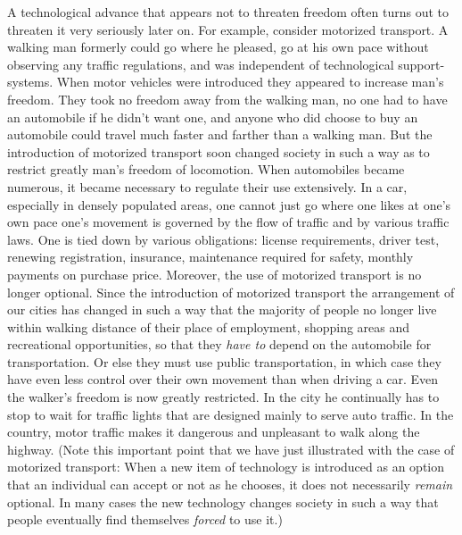  A technological advance that appears not to threaten freedom often turns out to threaten it very seriously later on. For example, consider motorized transport. A walking man formerly could go where he pleased, go at his own pace without observing any traffic regulations, and was independent of technological support-systems. When motor vehicles were introduced they appeared to increase man’s freedom. They took no freedom away from the walking man, no one had to have an automobile if he didn’t want one, and anyone who did choose to buy an automobile could travel much faster and farther than a walking man. But the introduction of motorized transport soon changed society in such a way as to restrict greatly man’s freedom of locomotion. When automobiles became numerous, it became necessary to regulate their use extensively. In a car, especially in densely populated areas, one cannot just go where one likes at one’s own pace one’s movement is governed by the flow of traffic and by various traffic laws. One is tied down by various obligations: license requirements, driver test, renewing registration, insurance, maintenance required for safety, monthly payments on purchase price. Moreover, the use of motorized transport is no longer optional. Since the introduction of motorized transport the arrangement of our cities has changed in such a way that the majority of people no longer live within walking distance of their place of employment, shopping areas and recreational opportunities, so that they {\em have to} depend on the automobile for transportation. Or else they must use public transportation, in which case they have even less control over their own movement than when driving a car. Even the walker’s freedom is now greatly restricted. In the city he continually has to stop to wait for traffic lights that are designed mainly to serve auto traffic. In the country, motor traffic makes it dangerous and unpleasant to walk along the highway. (Note this important point that we have just illustrated with the case of motorized transport: When a new item of technology is introduced as an option that an individual can accept or not as he chooses, it does not necessarily {\em remain} optional. In many cases the new technology changes society in such a way that people eventually find themselves {\em forced} to use it.)

